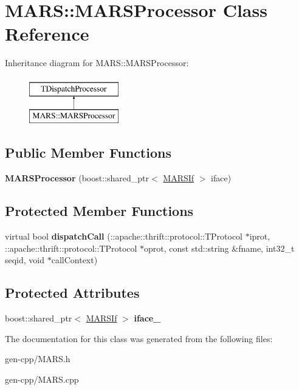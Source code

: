 \hypertarget{classMARS_1_1MARSProcessor}{}\section{M\+A\+RS\+:\+:M\+A\+R\+S\+Processor Class Reference}
\label{classMARS_1_1MARSProcessor}
Inheritance diagram for M\+A\+RS\+:\+:M\+A\+R\+S\+Processor\+:\begin{figure}[H]
\begin{center}
\leavevmode
\includegraphics[height=2.000000cm]{classMARS_1_1MARSProcessor}
\end{center}
\end{figure}
\subsection*{Public Member Functions}
\begin{DoxyCompactItemize}
\item 
\mbox{\label{classMARS_1_1MARSProcessor_a13e3d6f25435c7255b9f3d824aca8ab7}} 
{\bfseries M\+A\+R\+S\+Processor} (boost\+::shared\+\_\+ptr$<$ \hyperlink{classMARS_1_1MARSIf}{M\+A\+R\+S\+If} $>$ iface)
\end{DoxyCompactItemize}
\subsection*{Protected Member Functions}
\begin{DoxyCompactItemize}
\item 
\mbox{\label{classMARS_1_1MARSProcessor_aa64fae822585f4dc16daf9175b69b60d}} 
virtual bool {\bfseries dispatch\+Call} (\+::apache\+::thrift\+::protocol\+::\+T\+Protocol $\ast$iprot, \+::apache\+::thrift\+::protocol\+::\+T\+Protocol $\ast$oprot, const std\+::string \&fname, int32\+\_\+t seqid, void $\ast$call\+Context)
\end{DoxyCompactItemize}
\subsection*{Protected Attributes}
\begin{DoxyCompactItemize}
\item 
\mbox{\label{classMARS_1_1MARSProcessor_a14cd99f66089463d642206898afbf266}} 
boost\+::shared\+\_\+ptr$<$ \hyperlink{classMARS_1_1MARSIf}{M\+A\+R\+S\+If} $>$ {\bfseries iface\+\_\+}
\end{DoxyCompactItemize}


The documentation for this class was generated from the following files\+:\begin{DoxyCompactItemize}
\item 
gen-\/cpp/M\+A\+R\+S.\+h\item 
gen-\/cpp/M\+A\+R\+S.\+cpp\end{DoxyCompactItemize}

